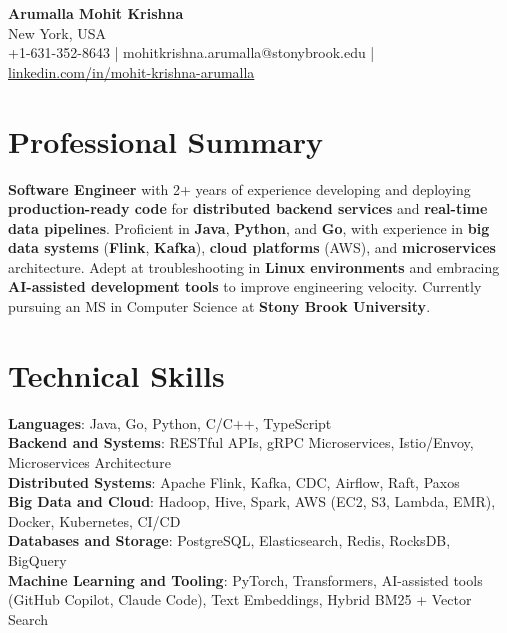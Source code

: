 \documentclass[letterpaper,11pt]{article}
\begin{document}
\begin{center}
  {\Large \textbf{Arumalla Mohit Krishna}} \\
  New York, USA \\
  +1-631-352-8643 \enspace | \enspace mohitkrishna.arumalla@stonybrook.edu \enspace | \enspace \href{https://www.linkedin.com/in/mohit-krishna-arumalla}{linkedin.com/in/mohit-krishna-arumalla}
\end{center}

\section{Professional Summary}
  \begin{itemize}[leftmargin=0.15in, label={}]
    \small{\item{
     \textbf{Software Engineer} with 2+ years of experience developing and deploying \textbf{production-ready code} for \textbf{distributed backend services} and \textbf{real-time data pipelines}. Proficient in \textbf{Java}, \textbf{Python}, and \textbf{Go}, with experience in \textbf{big data systems} (\textbf{Flink}, \textbf{Kafka}), \textbf{cloud platforms} (AWS), and \textbf{microservices} architecture. Adept at troubleshooting in \textbf{Linux environments} and embracing \textbf{AI-assisted development tools} to improve engineering velocity. Currently pursuing an MS in Computer Science at \textbf{Stony Brook University}.
    }}
  \end{itemize}
\vspace{-16pt}

\section{Technical Skills}
 \begin{itemize}[leftmargin=0.15in, label={}]
    \small{\item{
     \textbf{Languages}: Java, Go, Python, C/C++, TypeScript \\
     \textbf{Backend and Systems}: RESTful APIs, gRPC Microservices, Istio/Envoy, Microservices Architecture \\
     \textbf{Distributed Systems}: Apache Flink, Kafka, CDC, Airflow, Raft, Paxos \\
     \textbf{Big Data and Cloud}: Hadoop, Hive, Spark, AWS (EC2, S3, Lambda, EMR), Docker, Kubernetes, CI/CD \\
     \textbf{Databases and Storage}: PostgreSQL, Elasticsearch, Redis, RocksDB, BigQuery \\
     \textbf{Machine Learning and Tooling}: PyTorch, Transformers, AI-assisted tools (GitHub Copilot, Claude Code), Text Embeddings, Hybrid BM25 + Vector Search
    }}
 \end{itemize}
\vspace{-16pt}
\end{document}
